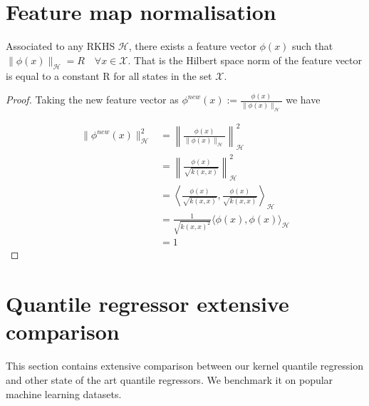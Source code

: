 \section{Feature map normalisation}\label{appendix:new_feature}

\begin{lemma}
    Associated to any RKHS $\mathcal{H}$, there exists a feature vector $\phi(x)$ such that $\|\phi(x)\|_{\mathcal{H}}=R \quad \forall x \in \mathcal{X}$.
    That is the Hilbert space norm of the feature vector is equal to a constant R for all states in the set $\mathcal{X}$.
\end{lemma}

\begin{proof}
    Taking the new feature vector as $\phi^{new} (x):=\frac{\phi(x)}{\|\phi(x)\|_{\mathcal{H}}}$ we have

\begin{align*}
    \|
    \phi^{new}(x)\|_{\mathcal{H}}^{2} &= \left\|\frac{\phi(x)}{\|\phi(x)\|_{\mathcal{H}}}
    \right\|_{\mathcal{H}}^{2}
    \\
    &=
    \left\|
    \frac{\phi(x)}
    {\sqrt{k(x,x)}}
    \right\|_{\mathcal{H}}^{2}
    \\
    &=
    \left\langle
    \frac{\phi(x)}
    {\sqrt{k(x,x)}}
    ,
    \frac{\phi(x)}
    {\sqrt{k(x,x)}}
    \right\rangle_{\mathcal{H}}
    \\
    &=
    \frac{1}{\sqrt{k(x,x)^{2}}}
    \langle
    \phi(x)
    ,
    \phi(x)
    \rangle_{\mathcal{H}}
    \\
    &=1
\end{align*}
\end{proof}

\section{Quantile regressor extensive comparison}\label{appendix:quantile_regressor_extensive_comparison}
This section contains extensive comparison between our kernel quantile regression and other state of the art quantile regressors. We benchmark it on popular machine learning datasets.
